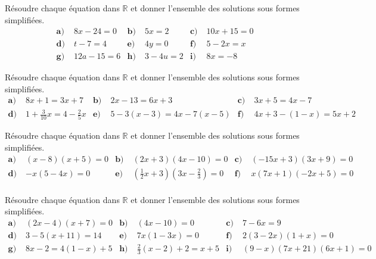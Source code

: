 \documentclass[11pt]{article}
\begin{document}
\begin{exo}
  Résoudre chaque équation dans $\mathbb{R}$ et donner l'ensemble des solutions
  sous formes simplifiées.
  \begin{align*}
    \textbf{a)}\;& 8x-24 = 0 &
    \textbf{b)}\;& 5x = 2 &
    \textbf{c)}\;& 10x+15 = 0 \\
    \textbf{d)}\;& t-7 = 4 &
    \textbf{e)}\;& 4y = 0 &
    \textbf{f)}\;& 5-2x = x \\
    \textbf{g)}\;& 12a-15 = 6 &
    \textbf{h)}\;& 3-4u = 2 &
    \textbf{i)}\;& 8x = -8
  \end{align*}
\end{exo}


\begin{exo}
  Résoudre chaque équation dans $\mathbb{R}$ et donner l'ensemble des solutions
  sous formes simplifiées.
  \begin{align*}
    \textbf{a)}\;& 8x+1 = 3x+7 &
    \textbf{b)}\;& 2x-13 = 6x+3 &
    \textbf{c)}\;& 3x+5 = 4x-7 \\
    \textbf{d)}\;& 1+\frac{3}{10}x = 4-\frac{2}{5}x &
    \textbf{e)}\;& 5-3(x-3) = 4x-7(x-5) &
    \textbf{f)}\;& 4x+3-(1-x)=5x+2
  \end{align*}
\end{exo}

\begin{exo}
  Résoudre chaque équation dans $\mathbb{R}$ et donner l'ensemble des solutions
  sous formes simplifiées.
  \begin{align*}
    \textbf{a)}\;& (x-8)(x+5) = 0 &
    \textbf{b)}\;& (2x+3)(4x-10) = 0 &
    \textbf{c)}\;& (-15x+3)(3x+9) = 0 \\
    \textbf{d)}\;& -x(5-4x) = 0 &
    \textbf{e)}\;& \left(\frac{1}{2}x+3\right)\left(3x-\frac{2}{3}\right) = 0 &
    \textbf{f)}\;& x(7x+1)(-2x+5) = 0 \\
  \end{align*}
\end{exo}

\begin{exo}
  Résoudre chaque équation dans $\mathbb{R}$ et donner l'ensemble des solutions
  sous formes simplifiées.
  \begin{align*}
    \textbf{a)}\;& (2x-4)(x+7) = 0 &
    \textbf{b)}\;& (4x-10) = 0 &
    \textbf{c)}\;& 7-6x = 9 \\
    \textbf{d)}\;& 3-5(x+11) = 14 &
    \textbf{e)}\;& 7x(1-3x) = 0 &
    \textbf{f)}\;& 2(3-2x)(1+x)=0 \\
    \textbf{g)}\;& 8x-2 = 4(1-x)+5 &
    \textbf{h)}\;& \frac{2}{3}(x-2)+2 = x+5 &
    \textbf{i)}\;& (9-x)(7x+21)(6x+1)=0 \\
  \end{align*}
\end{exo}
\end{document}
